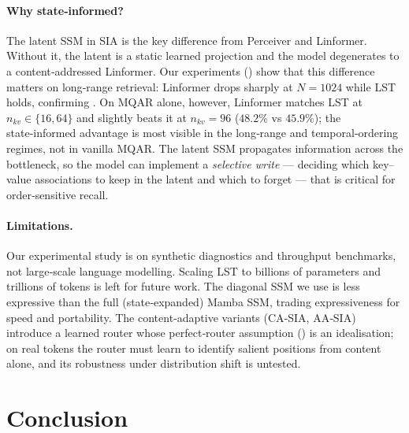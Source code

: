 \documentclass[10pt,twocolumn,letterpaper]{article}
\newcommand{\LST}{\textsc{LST}}
\newcommand{\SIA}{\textsc{SIA}}
\begin{document}
\paragraph{Why state‑informed?}  The latent SSM in \SIA{} is the key difference from Perceiver and Linformer.  Without it, the latent is a static learned projection and the model degenerates to a content‑addressed Linformer.  Our experiments () show that this difference matters on long‑range retrieval: Linformer drops sharply at $N\!=\!1024$ while \LST{} holds, confirming .  On MQAR alone, however, Linformer matches \LST{} at $n_{kv}\!\in\!\{16,64\}$ and slightly beats it at $n_{kv}\!=\!96$ ($48.2\%$ vs $45.9\%$); the state‑informed advantage is most visible in the long‑range and temporal‑ordering regimes, not in vanilla MQAR.  The latent SSM propagates information across the bottleneck, so the model can implement a \emph{selective write} — deciding which key–value associations to keep in the latent and which to forget — that is critical for order‑sensitive recall.

\paragraph{Limitations.}  Our experimental study is on synthetic diagnostics and throughput benchmarks, not large‑scale language modelling.  Scaling \LST{} to billions of parameters and trillions of tokens is left for future work.  The diagonal SSM we use is less expressive than the full (state‑expanded) Mamba SSM, trading expressiveness for speed and portability.  The content‑adaptive variants (CA‑\SIA{}, AA‑\SIA{}) introduce a learned router whose perfect‑router assumption () is an idealisation; on real tokens the router must learn to identify salient positions from content alone, and its robustness under distribution shift is untested.

\section{Conclusion}
\label{sec:conclusion}
\end{document}
